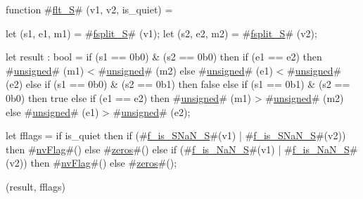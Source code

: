 function #\hyperref[sailRISCVzfltzyS]{flt\_S}#   (v1,       v2,        is_quiet) = {
  let (s1, e1, m1) = #\hyperref[sailRISCVzfsplitzyS]{fsplit\_S}# (v1);
  let (s2, e2, m2) = #\hyperref[sailRISCVzfsplitzyS]{fsplit\_S}# (v2);

  let result : bool =
    if (s1 == 0b0) & (s2 == 0b0) then
      if   (e1 == e2)
      then #\hyperref[sailRISCVzunsigned]{unsigned}# (m1) < #\hyperref[sailRISCVzunsigned]{unsigned}# (m2)
      else #\hyperref[sailRISCVzunsigned]{unsigned}# (e1) < #\hyperref[sailRISCVzunsigned]{unsigned}# (e2)
    else if (s1 == 0b0) & (s2 == 0b1)
    then false
    else if (s1 == 0b1) & (s2 == 0b0)
    then true
    else
        if   (e1 == e2)
        then #\hyperref[sailRISCVzunsigned]{unsigned}# (m1) > #\hyperref[sailRISCVzunsigned]{unsigned}# (m2)
        else #\hyperref[sailRISCVzunsigned]{unsigned}# (e1) > #\hyperref[sailRISCVzunsigned]{unsigned}# (e2);

  let fflags = if is_quiet then
                 if   (#\hyperref[sailRISCVzfzyiszySNaNzyS]{f\_is\_SNaN\_S}#(v1) | #\hyperref[sailRISCVzfzyiszySNaNzyS]{f\_is\_SNaN\_S}#(v2))
                 then #\hyperref[sailRISCVznvFlag]{nvFlag}#()
                 else #\hyperref[sailRISCVzzzeros]{zeros}#()
               else
                 if   (#\hyperref[sailRISCVzfzyiszyNaNzyS]{f\_is\_NaN\_S}#(v1) | #\hyperref[sailRISCVzfzyiszyNaNzyS]{f\_is\_NaN\_S}#(v2))
                 then #\hyperref[sailRISCVznvFlag]{nvFlag}#()
                 else #\hyperref[sailRISCVzzzeros]{zeros}#();

  (result, fflags)
}
